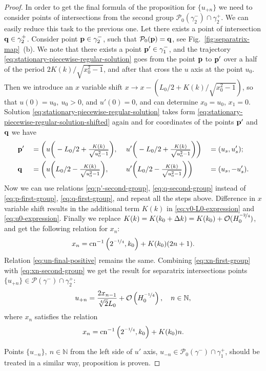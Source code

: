 \begin{proof}
	In order to get the final formula of the proposition for $\{ u_{+n} \}$ we need to consider points of intersections from the second group $\mathcal{P}_0 (\gamma_2^-) \cap \gamma_2^+$.
	We can easily reduce this task to the previous one.
	Let there exists a point of intersection $\vb{q} \in \gamma_2^+$. 
	Consider point $\vb{p} \in \gamma_2^-$, such that $\mathcal{P}_0(\vb{p}) = \vb{q}$, see Fig.~\ref{fig:separatrix-map}~(b).
	We note that there exists a point $\vb{p}' \in \gamma_1^-$, and the trajectory \eqref{eq:stationary-piecewise-regular-solution} goes from the point $\vb{p}$ to $\vb{p}'$ over a half of the period $2K(k) / \sqrt{x_0^2 - 1}$, and after that cross the $u$ axis at the point $u_0$.
	Then we introduce an $x$ variable shift $x \to x - (L_0 / 2 + K(k) / \sqrt{x_0^2 - 1})$, so that $u(0) = u_0, \ u_0 > 0$, and $u'(0) = 0$, and can determine $x_0 = u_0$, $x_1 = 0$.
	Solution \eqref{eq:stationary-piecewise-regular-solution} takes form \eqref{eq:stationary-piecewise-regular-solution-shifted} again and for coordinates of the points $\vb{p}'$ and $\vb{q}$ we have
	\begin{alignat}{4}
		& \vb{p}' && = \bigg( u \bigg( -L_0 / 2 + \tfrac{K(k)}{\sqrt{u_0^2 - 1}} \bigg), && \ u' \bigg( -L_0 / 2 + \tfrac{K(k)}{\sqrt{u_0^2 - 1}} \bigg) \bigg) && = (u_s, u_s'); \label{eq:p'-second-group} \\
		& \vb{q} && = \bigg( u \bigg(L_0 / 2 - \tfrac{K(k)}{\sqrt{u_0^2 - 1}} \bigg),  && \ u' \bigg( L_0 / 2 - \tfrac{K(k)}{\sqrt{u_0^2 - 1}} \bigg) \bigg) && = (u_s, -u_s'). \label{eq:q-second-group}
    \end{alignat}
    Now we can use relations \eqref{eq:p'-second-group}, \eqref{eq:q-second-group} instead of \eqref{eq:p-first-group}, \eqref{eq:q-first-group}, and repeat all the steps above.
    Difference in $x$ variable shift results in the additional term $K(k)$ in \eqref{eq:v0-L0-expression} and \eqref{eq:u0-expression}.
    Finally we replace $K(k) = K(k_0 + \Delta k) = K(k_0) + \mathcal{O}(H_0^{\nicefrac{-2}{4}})$, and get the following relation for $x_n$:
	\begin{equation}
		x_n = \mathrm{cn}^{-1} \left( 2^{\nicefrac{-1}{4}}, k_0 \right) + K(k_0) (2n + 1).
	\label{eq:xn-second-group}
	\end{equation}
	Relation \eqref{eq:un-final-positive} remains the same.
	Combining \eqref{eq:xn-first-group} with \eqref{eq:xn-second-group} we get the result for separatrix intersections points $\{ u_{+n} \} \in \mathcal{P}(\gamma^-) \cap \gamma_2^+$:
	\begin{equation}
		u_{+n} = \frac{2 x_{n-1}}{\sqrt[4]{2} L_0} + \mathcal{O} \left( H_0^{\nicefrac{-1}{4}} \right), \quad n \in \mathbb{N},
	\label{eq:us-final}
	\end{equation}
	where $x_n$ satisfies the relation
	\begin{equation}
		x_n = \mathrm{cn}^{-1} \left( 2^{\nicefrac{-1}{4}}, k_0 \right) + K(k_0) n.
	\label{eq:xn-final}
	\end{equation}
	
	Points $\{ u_{-n} \} , \ n \in \mathbb{N}$ from the left side of $u'$ axis, $u_{-n} \in \mathcal{P}_0(\gamma^-) \cap \gamma_1^+$, should be treated in a similar way, proposition is proven.
\end{proof}

